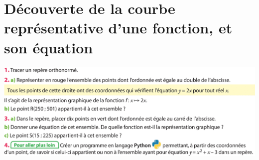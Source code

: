 \documentclass{article}
\begin{document}
\section{Découverte de la courbe représentative d'une fonction, et son équation}

\includegraphics[width=\textwidth]{Activite.png}
\end{document}
